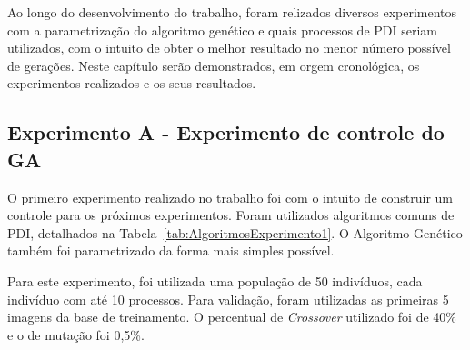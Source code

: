 \documentclass[12pt,oneside,a4paper,english,french,spanish,brazil,]{abntex2}
\begin{document}
Ao longo do desenvolvimento do trabalho, foram relizados diversos experimentos com a parametrização do algoritmo genético e quais processos de PDI seriam utilizados, com o intuito de obter o melhor resultado no menor número possível de gerações. Neste capítulo serão demonstrados, em orgem cronológica, os experimentos realizados e os seus resultados.

\subsection{Experimento A - Experimento de controle do GA}

O primeiro experimento realizado no trabalho foi com o intuito de construir um controle para os próximos experimentos. Foram utilizados algoritmos comuns de PDI, detalhados na Tabela~\ref{tab:AlgoritmosExperimento1}. O Algoritmo Genético também foi parametrizado da forma mais simples possível. 

Para este experimento, foi utilizada uma população de 50 indivíduos, cada indivíduo com até 10 processos. Para validação, foram utilizadas as primeiras 5 imagens da base de treinamento. O percentual de \textit{Crossover} utilizado foi de 40\% e o de mutação foi 0,5\%.
\end{document}
